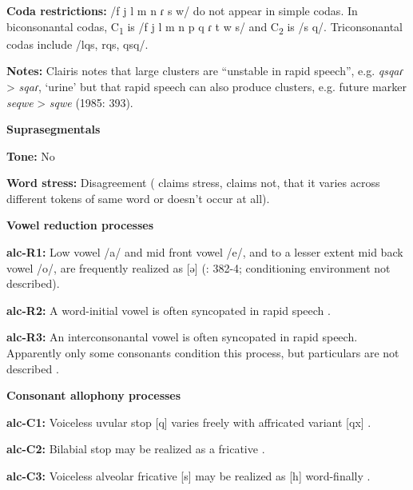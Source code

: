\textbf{Coda restrictions:} /f j l m n ɾ s w/ do not appear in simple codas. In biconsonantal codas, C\textsubscript{1} is /f j l m n p q ɾ t w s/ and C\textsubscript{2} is /s q/. Triconsonantal codas include /lqs, rqs, qsq/.



\textbf{Notes:} Clairis notes that large clusters are “unstable in rapid speech”, e.g. \textit{qsqaɾ} > \textit{sqaɾ}, ‘urine’ but that rapid speech can also produce clusters, e.g. future marker \textit{seqwe} > \textit{sqwe} (1985: 393).



\textbf{Suprasegmentals}



\textbf{Tone:} No



\textbf{Word stress:} Disagreement (\citealt{Clairis1977} claims stress, \citealt{Clairis1985} claims not, that it varies across different tokens of same word or doesn’t occur at all).



\textbf{Vowel reduction processes}



\textbf{alc-R1:} Low vowel /a/ and mid front vowel /e/, and to a lesser extent mid back vowel /o/, are frequently realized as [ə] (\citealt{Clairis1985}: 382-4; conditioning environment not described).



\textbf{alc-R2:} A word-initial vowel is often syncopated in rapid speech \citep[393]{Clairis1985}.



\textbf{alc-R3:} An interconsonantal vowel is often syncopated in rapid speech. Apparently only some consonants condition this process, but particulars are not described \citep[393]{Clairis1985}.



\textbf{Consonant allophony processes}



\textbf{alc-C1:} Voiceless uvular stop [q] varies freely with affricated variant [qx] \citep[378]{Clairis1985}.



\textbf{alc-C2:}  Bilabial stop may be realized as a fricative \citep{Aguilera2001}.



\textbf{alc-C3:} Voiceless alveolar fricative [s] may be realized as [h] word-finally \citep[372]{Clairis1985}.



